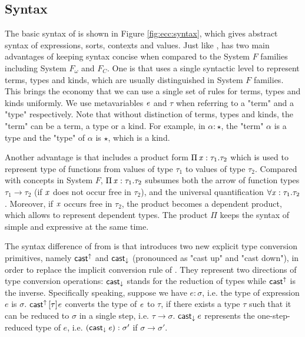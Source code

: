 \subsection{Syntax}\label{sec:ecc:syn}
The basic syntax of \expcc is shown in Figure \ref{fig:ecc:syntax}, which gives abstract syntax of expressions, sorts, contexts and values. Just like \cc, \expcc has two main advantages of keeping syntax concise when compared to the System $F$ families including System $F_\omega$ and $F_C$. One is that \expcc uses a single syntactic level to represent terms, types and kinds, which are usually distinguished in System $F$ families. This brings the economy that we can use a single set of rules for terms, types and kinds uniformly. We use metavariables $\mathit{e}$ and $\tau$ when referring to a "term" and a "type" respectively. Note that without distinction of terms, types and kinds, the "term" can be a term, a type or a kind. For example, in $\alpha :  \star $, the "term" $\alpha$ is a type and the "type" of $\alpha$ is $ \star $, which is a kind.

Another advantage is that \expcc includes a product form $\Pi \, \mathit{x}  :  \tau_{{\mathrm{1}}}  .  \tau_{{\mathrm{2}}}$ which is used to represent type of functions from values of type $\tau_{{\mathrm{1}}}$ to values of type $\tau_{{\mathrm{2}}}$. Compared with concepts in System $F$, $\Pi \, \mathit{x}  :  \tau_{{\mathrm{1}}}  .  \tau_{{\mathrm{2}}}$ subsumes both the arrow of function types $\tau_{{\mathrm{1}}}  \rightarrow  \tau_{{\mathrm{2}}}$ (if $\mathit{x}$ does not occur free in $\tau_{{\mathrm{2}}}$), and the universal quantification $\forall \mathit{x}:\tau_{{\mathrm{1}}}.\tau_{{\mathrm{2}}}$. Moreover, if $\mathit{x}$ occurs free in $\tau_{{\mathrm{2}}}$, the product becomes a dependent product, which allows to represent dependent types. The product $ \Pi $ keeps the syntax of \expcc simple and expressive at the same time.

The syntax difference of from \cc is that \expcc introduces two new explicit type conversion primitives, namely $ \mathsf{cast}^{\uparrow} $ and $ \mathsf{cast}_{\downarrow} $ (pronounced as "cast up" and "cast down"), in order to replace the implicit conversion rule of \cc. They represent two directions of type conversion operations: $ \mathsf{cast}_{\downarrow} $ stands for the reduction of types while $ \mathsf{cast}^{\uparrow} $ is the inverse. Specifically speaking, suppose we have $e:\sigma$, i.e. the type of expression $e$ is $\sigma$. $\mathsf{cast}^{\uparrow} \, [  \tau  ]  \mathit{e}$ converts the type of $\mathit{e}$ to $\tau$, if there exists a type $\tau$ such that it can be reduced to $\sigma$ in a single step, i.e. $\tau  \longrightarrow  \sigma$. $\mathsf{cast}_{\downarrow} \, \mathit{e}$ represents the one-step-reduced type of $e$, i.e. $(\mathsf{cast}_{\downarrow} \, \mathit{e}) : \sigma'$ if $\sigma  \longrightarrow  \sigma'$.

